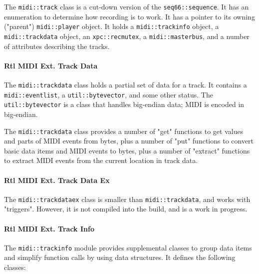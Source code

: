    The \texttt{midi::track} class is a cut-down version of
   the \texttt{seq66::sequence}.
   It has an enumeration to determine how recording is to work.
   It has a pointer to its owning ("parent") \texttt{midi::player} object.
   It holds a \texttt{midi::trackinfo} object, a
   \texttt{midi::trackdata} object, an
   \texttt{xpc::recmutex}, a
   \texttt{midi::masterbus},
   and a number of attributes describing the tracks.

\paragraph{Rtl MIDI Ext. Track Data}
\label{paragraph:rtl_midi_extensions_track_data}

   The \texttt{midi::trackdata} class holds a partial set of data for
   a track. It contains a
   \texttt{midi::eventlist}, a
   \texttt{util::bytevector}, and
   some other status.
   The \texttt{util::bytevector} is a class that handles big-endian data;
   MIDI is encoded in big-endian.

   The \texttt{midi::trackdata} class provides a number
   of "get" functions to get values and parts of MIDI events from
   bytes,
   plus a number of "put" functions to convert basic data items and
   MIDI events to bytes, 
   plus a number of "extract" functions to extract MIDI
   events from the current location in track data.

\paragraph{Rtl MIDI Ext. Track Data Ex}
\label{paragraph:rtl_midi_extensions_track_data_ex}

   The \texttt{midi::trackdataex} class is smaller than
   \texttt{midi::trackdata}, and works with "triggers".
   However, it is not compiled into the build, and is a work in progress.

\paragraph{Rtl MIDI Ext. Track Info}
\label{paragraph:rtl_midi_extensions_track_info}

   The \texttt{midi::trackinfo} module provides supplemental classes
   to group data items and simplify function calls by using data
   structures.
   It defines the following classes:


